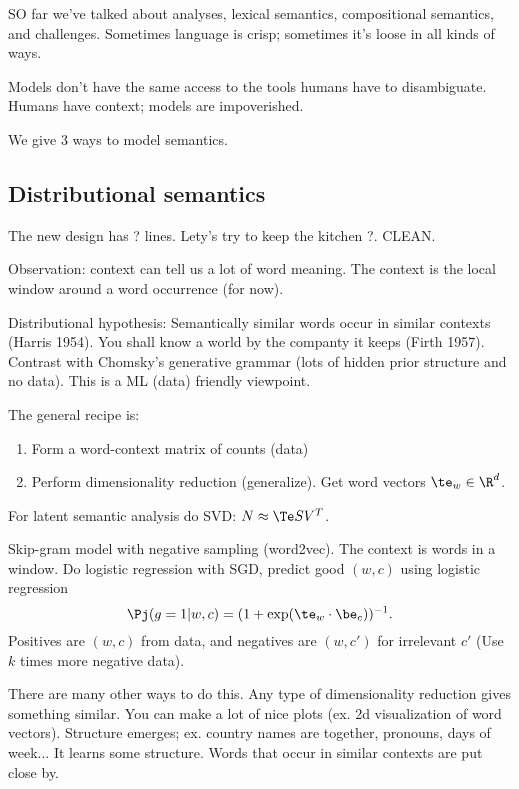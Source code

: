 SO far we've talked about analyses, lexical semantics, compositional semantics, and challenges. Sometimes language is crisp; sometimes it's loose in all kinds of ways.

Models don't have the same access to the tools humans have to disambiguate. Humans have context; models are impoverished.

We give 3 ways to model semantics.

\subsection{Distributional semantics}

The new design has ? lines. Lety's try to keep the kitchen ?. CLEAN. 

Observation: context can tell us a lot of word meaning. The context is the local window around a word occurrence (for now).

Distributional hypothesis: Semantically similar words occur in similar contexts (Harris 1954). You shall know a world by the companty it keeps (Firth 1957). Contrast with Chomsky's generative grammar (lots of hidden prior structure and no data). This is a ML (data) friendly viewpoint.

The general recipe is:
\begin{enumerate}
\item
Form a word-context matrix of counts (data)
\item
Perform dimensionality reduction (generalize). Get word vectors $\te_w\in \R^d$.
\end{enumerate}
For latent semantic analysis do SVD: $N\approx \Te S V^T$.

Skip-gram model with negative sampling (word2vec). The context is words in a window. Do logistic regression with SGD, predict good $(w,c)$ using logistic regression
$$
\Pj(g=1|w,c) = (1+\exp(\te_w\cdot \be_c))^{-1}.
$$
Positives are $(w,c)$ from data, and negatives are $(w,c')$ for irrelevant $c'$ (Use $k$ times more negative data).

There are many other ways to do this. Any type of dimensionality reduction gives something similar.
You can make a lot of nice plots (ex. 2d visualization of word vectors). Structure emerges; ex. country names are together, pronouns, days of week... It learns some structure. Words that occur in similar contexts are put close by.

